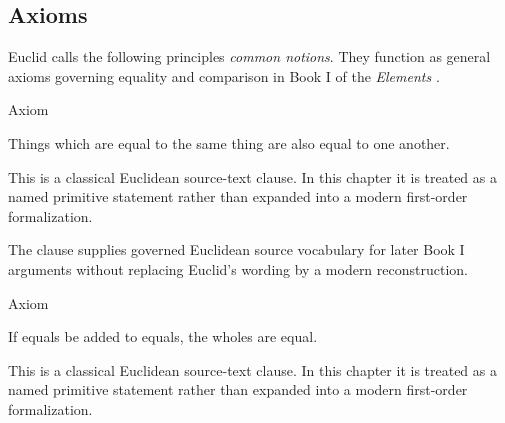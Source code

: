 \subsection*{Axioms}

\begin{remark*}
Euclid calls the following principles \textit{common notions}. They function as
general axioms governing equality and comparison in Book I of the
\textit{Elements} \citep[Book I, Common Notions 1--5]{euclid-elements-heath}.
\end{remark*}


\begin{axiombox}{Axiom}
\begin{axiom}
\label{ax:euclid-common-notion-things-equal-to-same}
Things which are equal to the same thing are also equal to one another.
\end{axiom}
\end{axiombox}
\begin{remark*}
This is a classical Euclidean source-text clause. In this chapter it is treated
as a named primitive statement rather than expanded into a modern first-order
formalization.
\end{remark*}

\begin{remark*}[Interpretation]
The clause supplies governed Euclidean source vocabulary for later Book I
arguments without replacing Euclid's wording by a modern reconstruction.
\end{remark*}

\begin{lra-not-visible}
\NoLocalDependencies
\end{lra-not-visible}

\begin{axiombox}{Axiom}
\begin{axiom}
\label{ax:euclid-common-notion-add-equals}
If equals be added to equals, the wholes are equal.
\end{axiom}
\end{axiombox}
\begin{remark*}
This is a classical Euclidean source-text clause. In this chapter it is treated
as a named primitive statement rather than expanded into a modern first-order
formalization.
\end{remark*}

